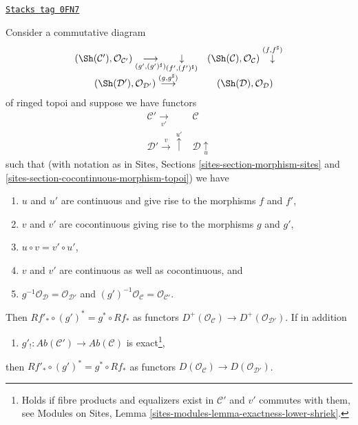 \begin{lemma}
\label{sites-cohomology-lemma-special-square-continuous}
\href{https://stacks.math.columbia.edu/tag/0FN7}{\texttt{Stacks tag 0FN7}}

Consider a commutative diagram
$$
\begin{array}{cc}(\Sh(\mathcal{C}'), \mathcal{O}_{\mathcal{C}'})
\underset{(g', (g')^\sharp)}{\longrightarrow}\underset{(f', (f')^\sharp)}{\downarrow} & (\Sh(\mathcal{C}), \mathcal{O}_\mathcal{C}) \overset{(f, f^\sharp)}{\downarrow} \\ (\Sh(\mathcal{D}'), \mathcal{O}_{\mathcal{D}'}) \overset{(g, g^\sharp)}{\longrightarrow} & (\Sh(\mathcal{D}), \mathcal{O}_\mathcal{D})\end{array}
$$
of ringed topoi and suppose we have functors
$$
\begin{array}{cc}\mathcal{C}' \underset{v'}{\longrightarrow} & \mathcal{C} \\ \mathcal{D}' \overset{v}{\longrightarrow}\overset{u'}{\uparrow} & \mathcal{D} \underset{u}{\uparrow}\end{array}
$$
such that (with notation as in
Sites, Sections \ref{sites-section-morphism-sites} and
\ref{sites-section-cocontinuous-morphism-topoi}) we have
\begin{enumerate}
\item $u$ and $u'$ are continuous and give rise to the morphisms
$f$ and $f'$,
\item $v$ and $v'$ are cocontinuous giving rise to the morphisms $g$ and $g'$,
\item $u \circ v = v' \circ u'$,
\item $v$ and $v'$ are continuous as well as cocontinuous, and
\item $g^{-1}\mathcal{O}_{\mathcal{D}} = \mathcal{O}_{\mathcal{D}'}$
and $(g')^{-1}\mathcal{O}_{\mathcal{C}} = \mathcal{O}_{\mathcal{C}'}$.
\end{enumerate}
Then $Rf'_* \circ (g')^* = g^* \circ Rf_*$ as functors
$D^+(\mathcal{O}_\mathcal{C}) \to D^+(\mathcal{O}_{\mathcal{D}'})$.
If in addition
\begin{enumerate}
\item[(6)] $g'_! : \textit{Ab}(\mathcal{C}') \to \textit{Ab}(\mathcal{C})$
is exact\footnote{Holds if fibre products and equalizers exist in
$\mathcal{C}'$ and $v'$ commutes with them, see
Modules on Sites, Lemma \ref{sites-modules-lemma-exactness-lower-shriek}.},
\end{enumerate}
then $Rf'_* \circ (g')^* = g^* \circ Rf_*$ as functors
$D(\mathcal{O}_\mathcal{C}) \to D(\mathcal{O}_{\mathcal{D}'})$.
\end{lemma}

